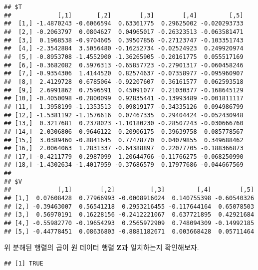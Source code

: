 \documentclass[
]{book}
\newenvironment{Shaded}{\begin{snugshade}}{\end{snugshade}}
\newcommand{\FunctionTok}[1]{\textcolor[rgb]{0.00,0.00,0.00}{#1}}
\newcommand{\NormalTok}[1]{#1}
\newcommand{\SpecialCharTok}[1]{\textcolor[rgb]{0.00,0.00,0.00}{#1}}
\begin{document}
\begin{verbatim}
## $T
##             [,1]       [,2]        [,3]        [,4]         [,5]
##  [1,] -1.4870243 -0.6066594  0.63361775  0.29625002 -0.020293733
##  [2,] -0.2063797  0.0804627  0.04965017 -0.26323513 -0.063581471
##  [3,]  0.1968538 -0.9704605  0.39507856 -0.27123747 -0.103351743
##  [4,] -2.3542884  3.5056480 -0.16252734 -0.02524923  0.249920974
##  [5,] -0.8953708 -1.4552900 -1.36265905 -0.20161775  0.055517169
##  [6,] -0.3682082  0.5976313 -0.65857723 -0.27901317 -0.060458246
##  [7,] -0.9354306  1.4144520  0.82574637 -0.07358977 -0.095960907
##  [8,]  2.4129728  0.6785064 -0.92207607  0.36161577  0.062593518
##  [9,]  2.6991862  0.7596591  0.45091077  0.21030377 -0.168645129
## [10,] -0.4050098 -0.2800099  0.92835441 -0.13993489 -0.001811117
## [11,]  1.3958199 -1.1353513  0.09819177 -0.34335126  0.094986799
## [12,] -1.5381192 -1.1576616  0.07467335  0.29404424 -0.052430948
## [13,]  0.3217681  0.2378023 -1.10180230 -0.28507243 -0.030666760
## [14,] -2.0306806 -0.9646122 -0.20906175  0.39639758  0.085778567
## [15,]  3.0389460 -0.8841645  0.77478770  0.04079855  0.349688462
## [16,]  2.0064063  1.2831337 -0.64388897  0.22077705 -0.188366873
## [17,] -0.4211779  0.2987099  1.20644766 -0.11766275 -0.068250990
## [18,] -1.4302634 -1.4017959 -0.37686579  0.17977686 -0.044667569
## 
## $V
##             [,1]        [,2]          [,3]         [,4]        [,5]
## [1,]  0.07608428  0.77966993 -0.0008916024  0.140755398 -0.60540326
## [2,] -0.39463007  0.56541218  0.2953216455 -0.117644164  0.65078503
## [3,]  0.56970191  0.16228156 -0.2412221067  0.637721895  0.42921684
## [4,] -0.55982770 -0.19654293  0.2565972909  0.748094309 -0.14992185
## [5,] -0.44778451  0.08636803 -0.8881182671  0.003668428  0.05711464
\end{verbatim}

위 분해된 행렬의 곱이 원 데이터 행렬 \(\mathbf{Z}\)과 일치하는지 확인해보자.

\begin{Shaded}
\end{Shaded}

\begin{verbatim}
## [1] TRUE
\end{verbatim}
\end{document}
